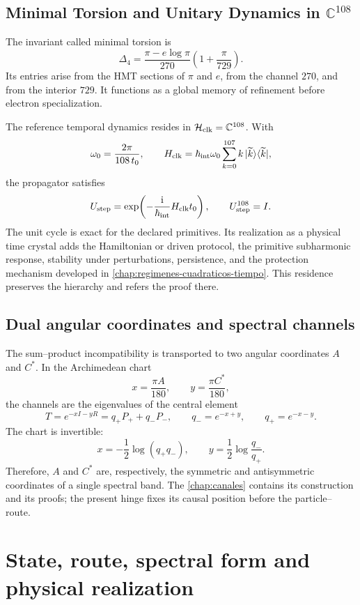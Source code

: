 \subsection{Minimal Torsion and Unitary Dynamics in \texorpdfstring{\(\mathbb C^{108}\)}{C108}}

The invariant called minimal torsion is
\[
 \Delta_4
 =
 \frac{\pi-e\log\pi}{270}
 \left(1+\frac{\pi}{729}\right).
\]
Its entries arise from the HMT sections of \(\pi\) and \(e\), from the channel
\(270\), and from the interior \(729\). It functions as a global memory of
refinement before electron specialization.

The reference temporal dynamics resides in
\(\mathcal H_{\rm clk}=\mathbb C^{108}\). With
\[
 \omega_0=\frac{2\pi}{108\,t_0},
 \qquad
 H_{\rm clk}
 =\hbar_{\rm int}\omega_0
 \sum_{k=0}^{107}k\,|\widetilde k\rangle
 \langle\widetilde k|,
\]
the propagator satisfies
\[
 U_{\rm step}
 =\exp\!\left(-\frac{\mathrm i}{\hbar_{\rm int}}
 H_{\rm clk}t_0\right),
 \qquad
 U_{\rm step}^{108}=I.
\]
The unit cycle is exact for the declared primitives. Its realization
as a physical time crystal adds the Hamiltonian or driven protocol,
the primitive subharmonic response, stability under perturbations,
persistence, and the protection mechanism developed in
\cref{chap:regimenes-cuadraticos-tiempo}. This residence preserves the
hierarchy and refers the proof there.

\subsection{Dual angular coordinates and spectral channels}

The sum--product incompatibility is transported to two angular coordinates
\(A\) and \(C^*\). In the Archimedean chart
\[
 x=\frac{\pi A}{180},
 \qquad
 y=\frac{\pi C^*}{180},
\]
the channels are the eigenvalues of the central element
\[
 T=e^{-xI-yR}=q_+P_++q_-P_-,
 \qquad
 q_-=e^{-x+y},
 \qquad
 q_+=e^{-x-y}.
\]
The chart is invertible:
\[
 x=-\frac12\log(q_+q_-),
 \qquad
 y=\frac12\log\frac{q_-}{q_+}.
\]
Therefore, \(A\) and \(C^*\) are, respectively, the symmetric and
antisymmetric coordinates of a single spectral band. The
\cref{chap:canales} contains its construction and its proofs; the
present hinge fixes its causal position before the particle--route.

\section{State, route, spectral form and physical realization}

